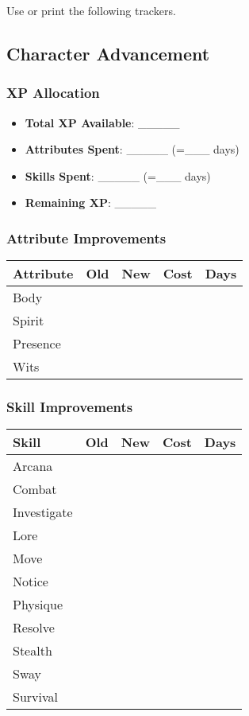 \begin{multicols}{2}
Use or print the following trackers.

\subsection{Character Advancement}
\subsubsection*{XP Allocation}
\begin{itemize}
  \item \textbf{Total XP Available}: \_\_\_\_\_
  \item \textbf{Attributes Spent}: \_\_\_\_\_ (=\_\_\_ days)
  \item \textbf{Skills Spent}: \_\_\_\_\_ (=\_\_\_ days)
  \item \textbf{Remaining XP}: \_\_\_\_\_
\end{itemize}

\subsubsection*{Attribute Improvements}
\begin{tabular}{|p{3cm}|c|c|c|c|}
\hline
\textbf{Attribute} & \textbf{Old} & \textbf{New} & \textbf{Cost} & \textbf{Days} \\
\hline
Body & & & & \\
Spirit & & & & \\
Presence & & & & \\
Wits & & & & \\
\hline
\end{tabular}

\subsubsection*{Skill Improvements}
\begin{tabular}{|p{4cm}|c|c|c|c|}
\hline
\textbf{Skill} & \textbf{Old} & \textbf{New} & \textbf{Cost} & \textbf{Days} \\
\hline
Arcana & & & & \\
Combat & & & & \\
Investigate & & & & \\
Lore & & & & \\
Move & & & & \\
Notice & & & & \\
Physique & & & & \\
Resolve & & & & \\
Stealth & & & & \\
Sway & & & & \\
Survival & & & & \\
\hline
\end{tabular}


\end{multicols}
